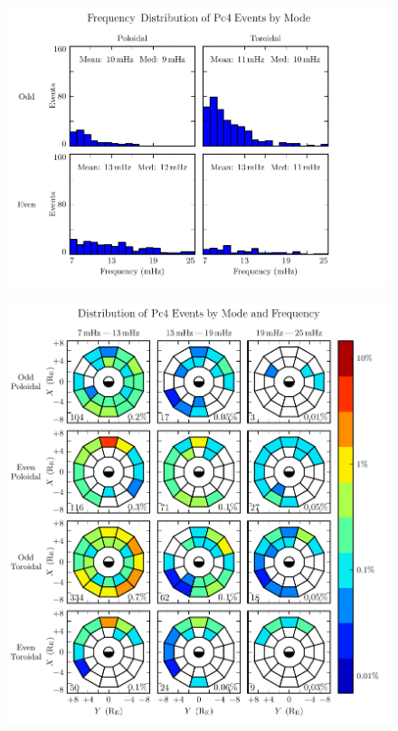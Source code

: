 \begin{figure}[!htb]
    \centering
    \includegraphics[width=\textwidth]{figures/f.pdf}
    \caption[Frequency Distribution of Pc4 Events by Mode]{
      \todo{$\cdots$}
    }
    \label{fig_f}
\end{figure}


\begin{figure}[!htb]
    \centering
    \includegraphics[width=\textwidth]{figures/mode_f.pdf}
    \caption[Observation Rate of Pc4 Events by Mode and Frequency]{
      \todo{$\cdots$}
    }
    \label{fig_mode_f}
\end{figure}


